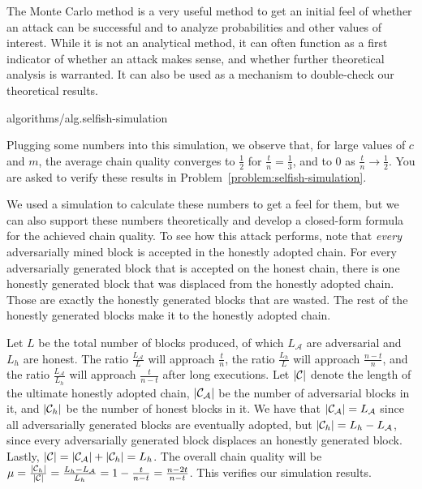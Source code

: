 The Monte Carlo method is a very useful method to get an initial feel of whether
an attack can be successful and to analyze probabilities and other values of interest.
While it is not an analytical method, it can often function as a first indicator
of whether an attack makes sense, and whether further theoretical analysis is warranted.
It can also be used as a mechanism to double-check our theoretical results.

{algorithms/alg.selfish-simulation}

Plugging some numbers into this simulation, we observe that, for large values of $c$
and $m$, the average chain quality converges to $\frac{1}{2}$ for $\frac{t}{n} = \frac{1}{3}$,
and to $0$ as $\frac{t}{n} \rightarrow \frac{1}{2}$. You are asked to verify these
results in Problem~\ref{problem:selfish-simulation}.

We used a simulation to calculate these numbers to get a feel for them, but we can also
support these numbers theoretically and develop a closed-form formula for the achieved
chain quality. To see how this attack performs, note that \emph{every} adversarially
mined block is accepted in the honestly adopted chain. For every adversarially generated
block that is accepted on the honest chain, there is one honestly generated block that
was displaced from the honestly adopted chain. Those are exactly the honestly generated
blocks that are wasted. The rest of the honestly generated blocks make it to the honestly
adopted chain.

Let $L$ be the total number of blocks produced, of which $L_\mathcal{A}$ are
adversarial and $L_h$ are honest. The ratio $\frac{L_\mathcal{A}}{L}$ will
approach $\frac{t}{n}$, the ratio $\frac{L_h}{L}$ will approach
$\frac{n - t}{n}$, and the ratio $\frac{L_\mathcal{A}}{L_h}$
will approach $\frac{t}{n - t}$ after long executions.
Let $|\mathcal{C}|$ denote the length of the
ultimate honestly adopted chain, $|\mathcal{C}_\mathcal{A}|$ be the number of
adversarial blocks in it, and $|\mathcal{C}_h|$ be the number of honest blocks
in it. We have that $|\mathcal{C}_\mathcal{A}| = L_\mathcal{A}$ since all
adversarially generated blocks are eventually adopted, but
$|\mathcal{C}_h| = L_h - L_\mathcal{A}$, since every adversarially generated
block displaces an honestly generated block. Lastly,
$|\mathcal{C}| = |\mathcal{C}_\mathcal{A}| + |\mathcal{C}_h| = L_h$.
The overall chain quality will be
$\mu = \frac{|\mathcal{C}_h|}{|\mathcal{C}|} = \frac{L_h - L_\mathcal{A}}{L_h} = 1 - \frac{t}{n - t} = \frac{n - 2t}{n - t}$.
This verifies our simulation results.

